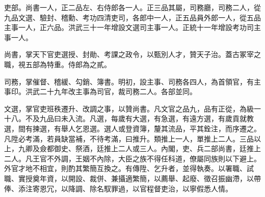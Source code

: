 吏部。尚書一人，正二品左、右侍郎各一人。正三品其屬，司務廳，司務二人，從九品文選、驗封、稽勳、考功四清吏司，各郎中一人，正五品員外郎一人，從五品主事一人，正六品。洪武三十一年增設文選司主事一人。正統十一年增設考功司主事一人。

尚書，掌天下官吏選授、封勛、考課之政令，以甄別人才，贊天子治。蓋古冢宰之職，視五部為特重。侍郎為之貳。

司務，掌催督、稽緩、勾銷、簿書。明初，設主事、司務各四人，為首領官，有主事印。洪武二十九年改主事為司官，裁司務二人。各部並同。

文選，掌官吏班秩遷升、改調之事，以贊尚書。凡文官之品九，品有正從，為級一十八。不及九品曰未入流。凡選，每歲有大選，有急選，有遠方選，有歲貢就教選，間有揀選，有舉人乞恩選。選人或登資簿，釐其流品，平其銓注，而序遷之。凡陞必考滿，若員缺當補，不待考滿，曰推升。類推上一人，單推上二人。三品以上，九卿及僉都御史、祭酒，廷推上二人或三人。內閣，吏、兵二部尚書，廷推上二人。凡王官不外調，王姻不內除，大臣之族不得任科道，僚屬同族則以下避上。外官才地不相宜，則酌其繁簡互換之。有傳陞、乞升者，並得執奏。以署職、試職、實授奠年資，以開設、裁併、兼攝適繁簡，以薦舉、起廢、徵召振幽滯，以帶俸、添注寄恩冗，以降調、除名馭罪過，以官程督吏治，以寧假悉人情。

